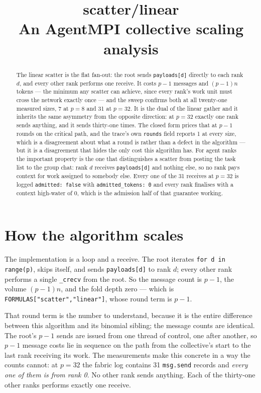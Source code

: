 \documentclass[11pt]{article}
\title{\textbf{scatter/linear}\\[2pt]\large An AgentMPI collective scaling analysis}
\author{}
\date{}
\begin{document}
\maketitle

\begin{abstract}
The linear scatter is the flat fan-out: the root sends \texttt{payloads[d]} directly to each rank
$d$, and every other rank performs one receive. It costs $p-1$ messages and $(p-1)n$ tokens ---
the minimum any scatter can achieve, since every rank's work unit must cross the network exactly
once --- and the sweep confirms both at all twenty-one measured sizes, 7 at $p=8$ and 31 at
$p=32$. It is the dual of the linear gather and it inherits the same asymmetry from the opposite
direction: at $p=32$ exactly one rank sends anything, and it sends thirty-one times. The closed
form prices that at $p-1$ rounds on the critical path, and the trace's own \texttt{rounds} field
reports 1 at every size, which is a disagreement about what a round is rather than a defect in the
algorithm --- but it is a disagreement that hides the only cost this algorithm has. For agent
ranks the important property is the one that distinguishes a scatter from posting the task list to
the group chat: rank $d$ receives \texttt{payloads[d]} and nothing else, so no rank pays context
for work assigned to somebody else. Every one of the 31 receives at $p=32$ is logged
\texttt{admitted: false} with \texttt{admitted\_tokens: 0} and every rank finalises with a context
high-water of 0, which is the admission half of that guarantee working.
\end{abstract}



\section{How the algorithm scales}

The implementation is a loop and a receive. The root iterates \texttt{for d in range(p)}, skips
itself, and sends \texttt{payloads[d]} to rank $d$; every other rank performs a single
\texttt{\_crecv} from the root. So the message count is $p-1$, the volume $(p-1)n$, and the fold
depth zero --- which is \texttt{FORMULAS["scatter","linear"]}, whose round term is $p-1$.

That round term is the number to understand, because it is the entire difference between this
algorithm and its binomial sibling; the message counts are identical. The root's $p-1$ sends are
issued from one thread of control, one after another, so $p-1$ message costs lie in sequence on
the path from the collective's start to the last rank receiving its work. The measurements make
this concrete in a way the counts cannot: at $p=32$ the fabric log contains 31
\texttt{msg.send} records and \emph{every one of them is from rank 0}. No other rank sends
anything. Each of the thirty-one other ranks performs exactly one receive.
\end{document}

